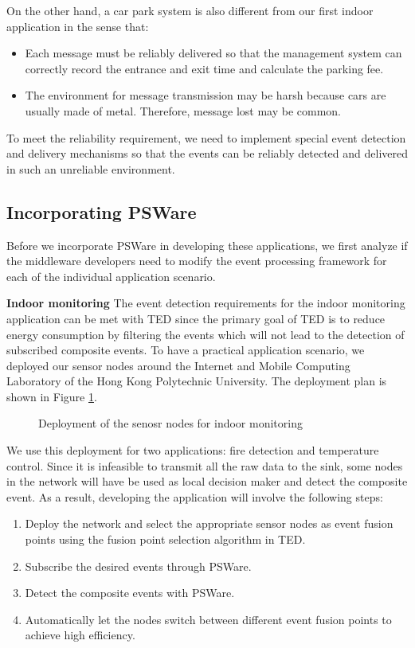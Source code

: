 On the other hand, a car park system is also different from our first indoor application in the sense that:
\begin{itemize}
\item Each message must be reliably delivered so that the management system can correctly record the entrance and exit time and calculate the parking fee.
\item The environment for message transmission may be harsh because cars are usually made of metal. Therefore, message lost may be common.
\end{itemize}
To meet the reliability requirement, we need to implement special event detection and delivery mechanisms so that the events can be reliably detected and delivered in such an unreliable environment.

\subsection{Incorporating PSWare}
Before we incorporate PSWare in developing these applications, we first analyze if the middleware developers need to modify the event processing framework for each of the individual application scenario.

\textbf{Indoor monitoring} The event detection requirements for the indoor monitoring application can be met with TED since the primary goal of TED is to reduce energy consumption by filtering the events which will not lead to the detection of subscribed composite events. To have a practical application scenario, we deployed our sensor nodes around the Internet and Mobile Computing Laboratory of the Hong Kong Polytechnic University. The deployment plan is shown in Figure \ref{fig:indoorDeployment}.

\begin{figure}
\centering
{}
\caption{Deployment of the senosr nodes for indoor monitoring}
\label{fig:indoorDeployment}
\end{figure}

We use this deployment for two applications: fire detection and temperature control. Since it is infeasible to transmit all the raw data to the sink, some nodes in the network will have be used as local decision maker and detect the composite event. As a result, developing the application will involve the following steps:
\begin{enumerate}
\item Deploy the network and select the appropriate sensor nodes as event fusion points using the fusion point selection algorithm in TED.
\item Subscribe the desired events through PSWare.
\item Detect the composite events with PSWare.
\item Automatically let the nodes switch between different event fusion points to achieve high efficiency.
\end{enumerate}

